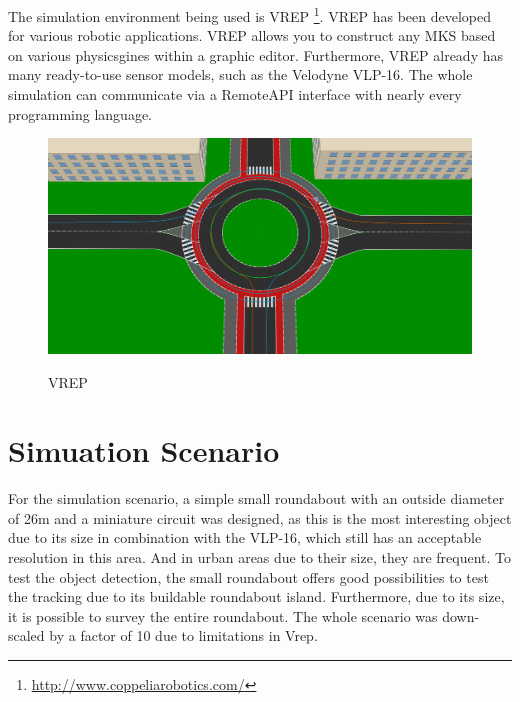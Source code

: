 \documentclass[11pt,oneside,openright]{mpreport}
\begin{document}
The simulation environment being used is VREP \footnote{\url{http://www.coppeliarobotics.com/}}. VREP has been developed for various robotic applications.
VREP allows you to construct any \ac{MKS} based on various physicsgines within a graphic editor. Furthermore, VREP already has many ready-to-use sensor models, such as
the Velodyne VLP-16. The whole simulation can communicate via a RemoteAPI interface with nearly every programming language.

\begin{figure}[!ht]
\caption{VREP}
\includegraphics[width=\textwidth]{bilder/path.png}
\label{vrep}
\end{figure}

\section{Simuation Scenario}


For the simulation scenario, a simple small roundabout with an outside diameter of 26m and a miniature circuit was designed,
as this is the most interesting object due to its size in combination with the VLP-16, which still has an acceptable resolution in this area.
And in urban areas due to their size, they are frequent. To test the object detection, the small roundabout offers good possibilities to test the tracking due to its buildable roundabout island.
Furthermore, due to its size, it is possible to survey the entire roundabout. The whole scenario was down-scaled by a factor of 10 due to limitations in Vrep.
\end{document}
